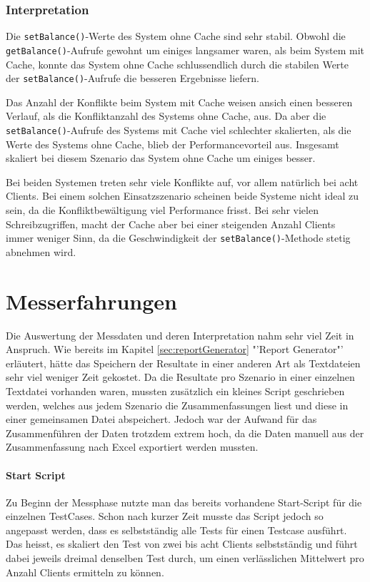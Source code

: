 \subsubsection{Interpretation}


Die \texttt{setBalance()}-Werte des System ohne Cache sind sehr stabil. Obwohl die \texttt{getBalance()}-Aufrufe gewohnt um einiges langsamer waren, als beim System mit Cache, konnte das System ohne Cache schlussendlich durch die stabilen Werte der \texttt{setBalance()}-Aufrufe die besseren Ergebnisse liefern.

Das Anzahl der Konflikte beim System mit Cache weisen ansich einen besseren Verlauf, als die Konfliktanzahl des Systems ohne Cache, aus. Da aber die \texttt{set\-Balance()}-Auf\-ru\-fe des Systems mit Cache viel schlechter skalierten, als die Werte des Systems ohne Cache, blieb der Performancevorteil aus. Insgesamt skaliert bei diesem Szenario das System ohne Cache um einiges besser.

Bei beiden Systemen treten sehr viele Konflikte auf, vor allem natürlich bei acht Clients. Bei einem solchen Einsatzszenario scheinen beide Systeme nicht ideal zu sein, da die Konfliktbewältigung viel Performance frisst. Bei sehr vielen Schreibzugriffen, macht der Cache aber bei einer steigenden Anzahl Clients immer weniger Sinn, da die Geschwindigkeit der  \texttt{setBalance()}-Methode stetig abnehmen wird.

\section{Messerfahrungen}
Die Auswertung der Messdaten und deren Interpretation nahm sehr viel Zeit in Anspruch. Wie bereits im Kapitel \ref{sec:reportGenerator} "'Report Generator"' erläutert, hätte das Speichern der Resultate in einer anderen Art als Textdateien sehr viel weniger Zeit gekostet. Da die Resultate pro Szenario in einer einzelnen Textdatei vorhanden waren, mussten zusätzlich ein kleines Script geschrieben werden, welches  aus jedem Szenario die Zusammenfassungen liest und diese in einer gemeinsamen Datei abspeichert. Jedoch war der Aufwand für das Zusammenführen der Daten trotzdem extrem hoch, da die Daten manuell aus der Zusammenfassung nach Excel exportiert werden mussten. 

\paragraph{Start Script}
Zu Beginn der Messphase nutzte man das bereits vorhandene Start-Script für die einzelnen TestCases. Schon nach kurzer Zeit musste das Script jedoch so angepasst werden, dass es selbstständig alle Tests für einen Testcase ausführt. Das heisst, es skaliert den Test von zwei bis acht Clients selbstständig und führt dabei jeweils dreimal denselben Test durch, um einen verlässlichen Mittelwert pro Anzahl Clients ermitteln zu können.

